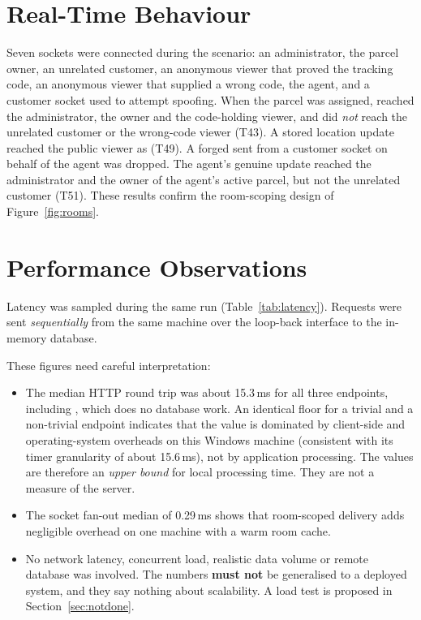 \section{Real-Time Behaviour}
\label{sec:rt-tests}

Seven sockets were connected during the scenario: an administrator, the parcel owner, an unrelated customer, an anonymous viewer that proved the tracking code, an anonymous viewer that supplied a wrong code, the agent, and a customer socket used to attempt spoofing. When the parcel was assigned,  reached the administrator, the owner and the code-holding viewer, and did \emph{not} reach the unrelated customer or the wrong-code viewer (T43). A stored location update reached the public viewer as  (T49). A forged  sent from a customer socket on behalf of the agent was dropped. The agent's genuine update reached the administrator and the owner of the agent's active parcel, but not the unrelated customer (T51). These results confirm the room-scoping design of Figure~\ref{fig:rooms}.

\section{Performance Observations}
\label{sec:perf}

Latency was sampled during the same run (Table~\ref{tab:latency}). Requests were sent \emph{sequentially} from the same machine over the loop-back interface to the in-memory database.



These figures need careful interpretation:
\begin{itemize}
  \item The median HTTP round trip was about 15.3\,ms for all three endpoints, including , which does no database work. An identical floor for a trivial and a non-trivial endpoint indicates that the value is dominated by client-side and operating-system overheads on this Windows machine (consistent with its timer granularity of about 15.6\,ms), not by application processing. The values are therefore an \emph{upper bound} for local processing time. They are not a measure of the server.
  \item The socket fan-out median of 0.29\,ms shows that room-scoped delivery adds negligible overhead on one machine with a warm room cache.
  \item No network latency, concurrent load, realistic data volume or remote database was involved. The numbers \textbf{must not} be generalised to a deployed system, and they say nothing about scalability. A load test is proposed in Section~\ref{sec:notdone}.
\end{itemize}

